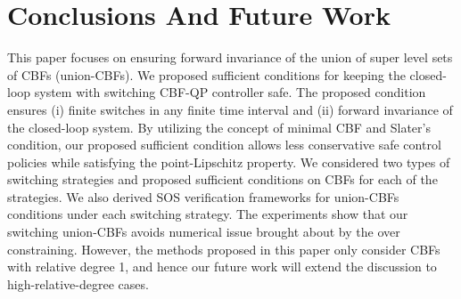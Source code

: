\documentclass[letterpaper, 10 pt, conference]{ieeeconf}  %
\begin{document}
\section{Conclusions And Future Work}
\label{sec:conclusion}
This paper focuses on ensuring forward invariance of the union of super level sets of CBFs (union-CBFs). We proposed sufficient conditions for keeping the closed-loop system with switching CBF-QP controller safe. The proposed condition ensures (i) finite switches in any finite time interval and (ii) forward invariance of the closed-loop system. By utilizing the concept of minimal CBF and Slater's condition, our proposed sufficient condition allows less conservative safe control policies while satisfying the point-Lipschitz property. We considered two types of switching strategies and proposed sufficient conditions on CBFs for each of the strategies. We also derived SOS verification frameworks for union-CBFs conditions under each switching strategy. The experiments show that our switching union-CBFs avoids numerical issue brought about by the over constraining. However, the methods proposed in this paper only consider CBFs with relative degree 1, and hence our future work will extend the discussion to high-relative-degree cases.




\end{document}
